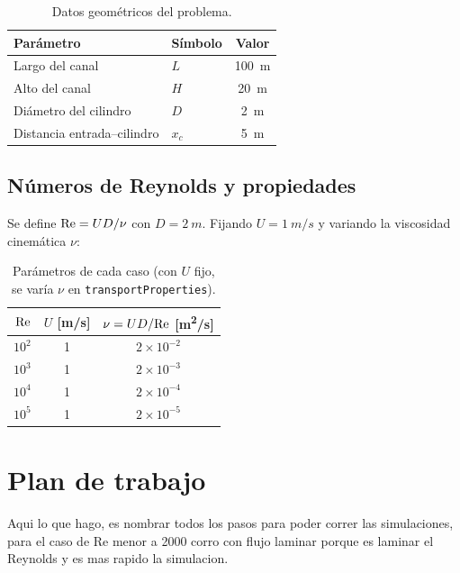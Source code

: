 \begin{table}[H]
\centering
\begin{tabular}{llc}
\toprule
Parámetro & Símbolo & Valor \\
\midrule
Largo del canal & $L$ & \SI{100}{m} \\
Alto del canal & $H$ & \SI{20}{m} \\
Diámetro del cilindro & $D$ & \SI{2}{m} \\
Distancia entrada--cilindro & $x_c$ & \SI{5}{m} \\
\bottomrule
\end{tabular}
\caption{Datos geométricos del problema.}
\end{table}



\subsection{Números de Reynolds y propiedades}
Se define $\mathrm{Re} = U D/\nu$ con $D = \SI{2}{m}$. Fijando $U = \SI{1}{m/s}$ y variando la viscosidad cinemática $\nu$:

\begin{table}[H]
\centering
\begin{tabular}{rcc}
\toprule
$\mathrm{Re}$ & $U$ [\si{m/s}] & $\nu = UD/\mathrm{Re}$ [\si{m^2/s}] \\
\midrule
$10^{2}$ & 1 & $2\times10^{-2}$ \\
$10^{3}$ & 1 & $2\times10^{-3}$ \\
$10^{4}$ & 1 & $2\times10^{-4}$ \\
$10^{5}$ & 1 & $2\times10^{-5}$ \\
\bottomrule
\end{tabular}
\caption{Parámetros de cada caso (con $U$ fijo, se varía $\nu$ en \texttt{transportProperties}).}
\end{table}

\section{Plan de trabajo}
Aqui lo que hago, es nombrar todos los pasos para poder correr las simulaciones, para el caso de Re menor a 2000 corro  con flujo laminar porque es laminar el Reynolds y es mas rapido la simulacion.

